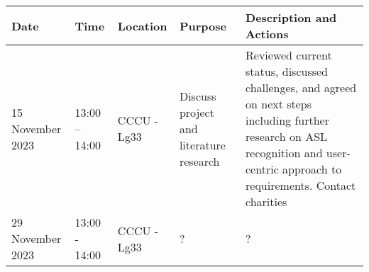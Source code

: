 \begin{longtable}{|p{2cm}|p{2cm}|p{3cm}|p{4cm}|p{4cm}|}
    \hline
    \textbf{Date}    & \textbf{Time} & \textbf{Location} & \textbf{Purpose}                        & \textbf{Description and Actions}                                                                                                                                                   \\
    \hline
    \endhead
    15 November 2023 & 13:00 – 14:00 & CCCU - Lg33       & Discuss project and literature research & Reviewed current status, discussed challenges, and agreed on next steps including further research on ASL recognition and user-centric approach to requirements. Contact charities \\
    \hline
    29 November 2023 & 13:00 - 14:00 & CCCU - Lg33       & ?                                       & ?                                                                                                                                                                                  \\
    \hline
\end{longtable}